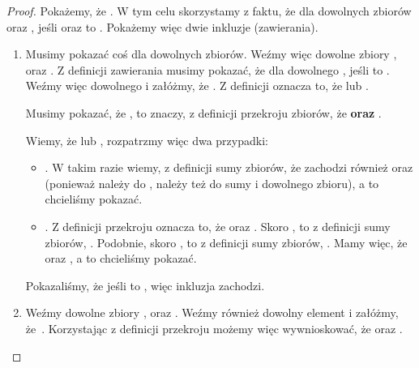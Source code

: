\begin{proof}
Pokażemy, że . W tym celu skorzystamy z faktu, że dla dowolnych zbiorów  oraz , jeśli  oraz  to . Pokażemy więc dwie inkluzje (zawierania).

\begin{enumerate}
    \item {}
    
    Musimy pokazać coś dla dowolnych zbiorów. Weźmy więc dowolne zbiory ,  oraz . Z definicji zawierania musimy pokazać, że dla dowolnego , jeśli  to . Weźmy więc dowolnego  i załóżmy, że . Z definicji oznacza to, że  lub .
    
    Musimy pokazać, że , to znaczy, z definicji przekroju zbiorów, że  \textbf{oraz} .
    
    Wiemy, że  lub , rozpatrzmy więc dwa przypadki: 
    
    \begin{itemize}
        \item {}. W takim razie wiemy, z definicji sumy zbiorów, że zachodzi również  oraz  (ponieważ  należy do , należy też do sumy  i dowolnego zbioru), a to chcieliśmy pokazać.
        
        \item {}. Z definicji przekroju oznacza to, że  oraz . Skoro , to z definicji sumy zbiorów, . Podobnie, skoro , to z definicji sumy zbiorów, . Mamy więc, że  oraz , a to chcieliśmy pokazać.
    \end{itemize}
    
    Pokazaliśmy, że jeśli  to , więc inkluzja zachodzi.
    
    \item {}
    
    Weźmy dowolne zbiory ,  oraz . Weźmy również dowolny element  i załóżmy, że~. Korzystając z definicji przekroju możemy więc wywnioskować, że  oraz . 
    

\end{enumerate}
\end{proof}

